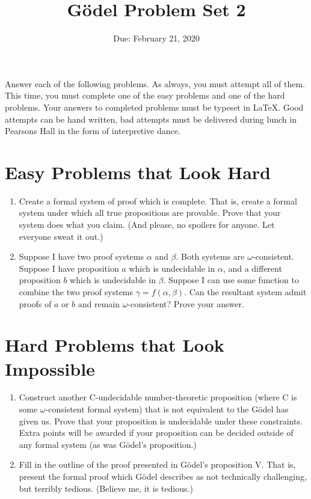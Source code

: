 \documentclass{article}
\title{G\"odel Problem Set 2}
\date{Due: February 21, 2020}
\begin{document}
\maketitle

Answer each of the following problems.  As always, you must attempt
all of them.  This time, you must complete one of the easy problems and
one of the hard problems.  Your answers to completed problems must be
typeset in \LaTeX.  Good attempts can be hand written, bad attempts
must be delivered during lunch in Pearsons Hall in the form of
interpretive dance.

\section{Easy Problems that Look Hard}
\begin{enumerate}
\item Create a formal system of proof which is complete.  That is,
create a formal system under which all true propositions are provable.
Prove that your system does what you claim.  (And please, no
spoilers for anyone.  Let everyone sweat it out.)

\item Suppose I have two proof systems $\alpha$ and $\beta$.  Both systems
are $\omega$-consistent.  Suppose I have proposition $a$ 
which is undecidable in $\alpha$, and a different proposition $b$
which is undecidable in $\beta$.  Suppose I can use some function to
combine the two proof systems $\gamma=f(\alpha,\beta)$.  Can the
resultant system admit proofs of $a$ or $b$ and remain
$\omega$-consistent?  Prove your answer.

\end{enumerate}

\section{Hard Problems that Look Impossible}
\begin{enumerate}
\item Construct another C-undecidable number-theoretic proposition
(where C is some $\omega$-consistent formal system) that is
not equivalent to the G\"odel has given us.  Prove that your
proposition is undecidable under these constraints.  Extra points will
be awarded if your proposition can be decided outside of any formal
system (as was G\"odel's proposition.)

\item Fill in the outline of the proof presented in G\"odel's
proposition V. That is, present the formal proof which G\"odel describes
as not technically challenging, but terribly tedious.  (Believe me, it
is tedious.)
\end{enumerate}
\end{document}
